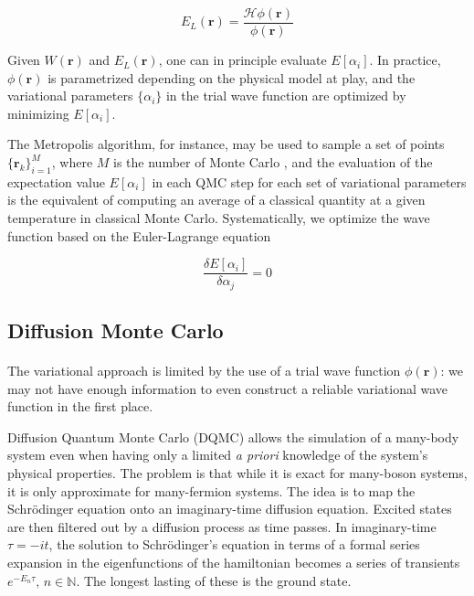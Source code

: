 \documentclass[10pt, twocolumn, twoside]{article}
\begin{document}
\begin{equation}
 E_L(\bm r) = \frac{\mathcal{H}\phi(\bm r)}{\phi (\bm r)}
\end{equation}

Given $W(\bm r)$ and $E_L(\bm r)$, one can in principle evaluate $E[\alpha_i]$. In practice, $\phi (\bm r) $ is parametrized depending on the physical model at play, and the variational parameters $\{\alpha_i\}$ in the trial wave function are optimized by minimizing $E[\alpha_i]$.\par

The Metropolis algorithm, for instance, may be used to sample a set of points $\{\bm r_k\}_{i=1}^M$, where $M$ is the number of Monte Carlo , and the evaluation of the expectation value $E[\alpha_i]$ in each QMC step for each set of variational parameters is the equivalent of computing an average of a classical quantity at a given temperature in classical Monte Carlo. Systematically, we optimize the wave function based on the Euler-Lagrange equation

\begin{equation}
\frac{\delta E[\alpha_i]}{\delta \alpha_j} = 0
\end{equation}

\subsection{Diffusion Monte Carlo}\label{subsec:dmc}\paragraph{}

The variational approach is limited by the use of a trial wave function $\phi (\bm r)$: we may not have enough information to even construct a reliable variational wave function in the first place. 

Diffusion Quantum Monte Carlo (DQMC) allows the simulation of a many-body system even when having only a limited \emph{a priori} knowledge of the system's physical properties. The problem is that while it is exact for many-boson systems, it is only approximate for many-fermion systems. The idea is to map the Schr\"odinger equation onto  an imaginary-time diffusion equation. Excited states are then filtered out by a diffusion process as time passes. In imaginary-time $\tau = - i t$, the solution to Schr\"odinger's equation in terms of a formal series expansion in the eigenfunctions of the hamiltonian becomes a series of transients $e^{-E_n \tau}, \, n \in \mathbb{N}$. The longest lasting of these is the ground state. \cite{kosztin} \par
\end{document}
